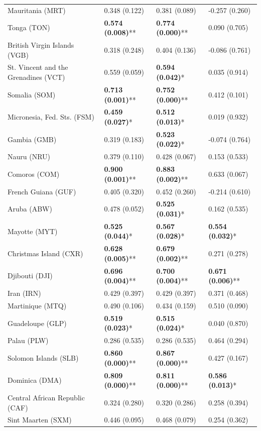 \begin{longtable}{p{4cm}p{3cm}p{3cm}p{3cm}}
Mauritania (MRT) & 0.348 (0.122) & 0.381 (0.089) & -0.257 (0.260) \\
Tonga (TON) & \textbf{0.574 (0.008)}** & \textbf{0.774 (0.000)}** & 0.090 (0.705) \\
British Virgin Islands (VGB) & 0.318 (0.248) & 0.404 (0.136) & -0.086 (0.761) \\
St. Vincent and the Grenadines (VCT) & 0.559 (0.059) & \textbf{0.594 (0.042)}* & 0.035 (0.914) \\
Somalia (SOM) & \textbf{0.713 (0.001)}** & \textbf{0.752 (0.000)}** & 0.412 (0.101) \\
Micronesia, Fed. Sts. (FSM) & \textbf{0.459 (0.027)}* & \textbf{0.512 (0.013)}* & 0.019 (0.932) \\
Gambia (GMB) & 0.319 (0.183) & \textbf{0.523 (0.022)}* & -0.074 (0.764) \\
Nauru (NRU) & 0.379 (0.110) & 0.428 (0.067) & 0.153 (0.533) \\
Comoros (COM) & \textbf{0.900 (0.001)}** & \textbf{0.883 (0.002)}** & 0.633 (0.067) \\
French Guiana (GUF) & 0.405 (0.320) & 0.452 (0.260) & -0.214 (0.610) \\
Aruba (ABW) & 0.478 (0.052) & \textbf{0.525 (0.031)}* & 0.162 (0.535) \\
Mayotte (MYT) & \textbf{0.525 (0.044)}* & \textbf{0.567 (0.028)}* & \textbf{0.554 (0.032)}* \\
Christmas Island (CXR) & \textbf{0.628 (0.005)}** & \textbf{0.679 (0.002)}** & 0.271 (0.278) \\
Djibouti (DJI) & \textbf{0.696 (0.004)}** & \textbf{0.700 (0.004)}** & \textbf{0.671 (0.006)}** \\
Iran (IRN) & 0.429 (0.397) & 0.429 (0.397) & 0.371 (0.468) \\
Martinique (MTQ) & 0.490 (0.106) & 0.434 (0.159) & 0.510 (0.090) \\
Guadeloupe (GLP) & \textbf{0.519 (0.023)}* & \textbf{0.515 (0.024)}* & 0.040 (0.870) \\
Palau (PLW) & 0.286 (0.535) & 0.286 (0.535) & 0.464 (0.294) \\
Solomon Islands (SLB) & \textbf{0.860 (0.000)}** & \textbf{0.867 (0.000)}** & 0.427 (0.167) \\
Dominica (DMA) & \textbf{0.809 (0.000)}** & \textbf{0.811 (0.000)}** & \textbf{0.586 (0.013)}* \\
Central African Republic (CAF) & 0.324 (0.280) & 0.320 (0.286) & 0.258 (0.394) \\
Sint Maarten (SXM) & 0.446 (0.095) & 0.468 (0.079) & 0.254 (0.362) \\

\end{longtable}
